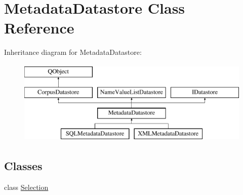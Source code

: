 \hypertarget{class_metadata_datastore}{}\section{Metadata\+Datastore Class Reference}
\label{class_metadata_datastore}
Inheritance diagram for Metadata\+Datastore\+:\begin{figure}[H]
\begin{center}
\leavevmode
\includegraphics[height=4.000000cm]{class_metadata_datastore}
\end{center}
\end{figure}
\subsection*{Classes}
\begin{DoxyCompactItemize}
\item 
class \hyperlink{class_metadata_datastore_1_1_selection}{Selection}
\end{DoxyCompactItemize}
